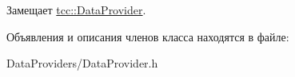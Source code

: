 Замещает \mbox{\hyperlink{classtcc_1_1_data_provider}{tcc\+::\+Data\+Provider}}.



Объявления и описания членов класса находятся в файле\+:\begin{DoxyCompactItemize}
\item 
Data\+Providers/Data\+Provider.\+h\end{DoxyCompactItemize}
